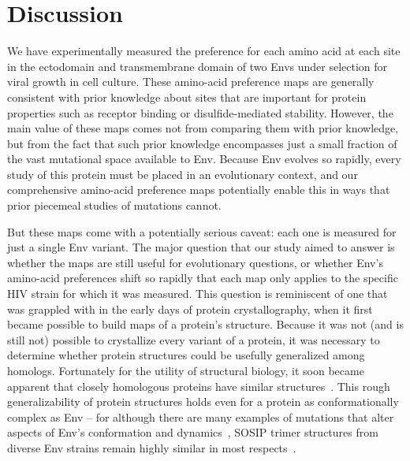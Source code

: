 \documentclass[9pt]{elife}
\begin{document}
\section{Discussion}
We have experimentally measured the preference for each amino acid at each site in the ectodomain and transmembrane domain of two Envs under selection for viral growth in cell culture.
These amino-acid preference maps are generally consistent with prior knowledge about sites that are important for protein properties such as receptor binding or disulfide-mediated stability.
However, the main value of these maps comes not from comparing them with prior knowledge, but from the fact that such prior knowledge encompasses just a small fraction of the vast mutational space available to Env.
Because Env evolves so rapidly, every study of this protein must be placed in an evolutionary context, and our comprehensive amino-acid preference maps potentially enable this in ways that prior piecemeal studies of mutations cannot.

But these maps come with a potentially serious caveat: each one is measured for just a single Env variant.
The major question that our study aimed to answer is whether the maps are still useful for evolutionary questions, or whether Env's amino-acid preferences shift so rapidly that each map only applies to the specific HIV strain for which it was measured.
This question is reminiscent of one that was grappled with in the early days of protein crystallography, when it first became possible to build maps of a protein's structure.
Because it was not (and is still not) possible to crystallize every variant of a protein, it was necessary to determine whether protein structures could be usefully generalized among homologs.
Fortunately for the utility of structural biology, it soon became apparent that closely homologous proteins have similar structures~\citep{chothia1986relation,sander1991database}.
This rough generalizability of protein structures holds even for a protein as conformationally complex as Env -- for although there are many examples of mutations that alter aspects of Env's conformation and dynamics~\citep{kwong2000structures,white2010molecular,almond2010structural,davenport2013isolate}, SOSIP trimer structures from diverse Env strains remain highly similar in most respects~\citep{julien2015design,pugach2015native,stewart2016trimeric,verkerke2016epitope,gristick2016natively}.
\end{document}
